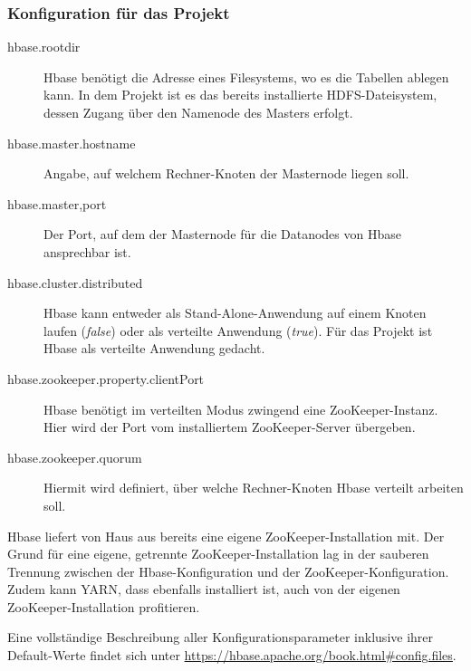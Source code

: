 \subsubsection{Konfiguration für das Projekt}

\lstset{basicstyle=\small}


\begin{description}
	\item[hbase.rootdir] Hbase benötigt die Adresse eines Filesystems, wo es die Tabellen ablegen kann. In dem Projekt ist es das bereits installierte
	HDFS-Dateisystem, dessen Zugang über den Namenode des Masters erfolgt.
	\item[hbase.master.hostname] Angabe, auf welchem Rechner-Knoten der Masternode liegen soll.
	\item[hbase.master,port] Der Port, auf dem der Masternode für die Datanodes von Hbase ansprechbar ist.
	\item[hbase.cluster.distributed] Hbase kann entweder als Stand-Alone-Anwendung auf einem Knoten laufen (\textit{false}) oder als verteilte Anwendung (\textit{true}).
	Für das Projekt ist Hbase als verteilte Anwendung gedacht.
	\item[hbase.zookeeper.property.clientPort] Hbase benötigt im verteilten Modus zwingend eine ZooKeeper-Instanz. Hier wird der Port vom installiertem ZooKeeper-Server 
	übergeben.
	\item[hbase.zookeeper.quorum] Hiermit wird definiert, über welche Rechner-Knoten Hbase verteilt arbeiten soll. 
\end{description}

Hbase liefert von Haus aus bereits eine eigene ZooKeeper-Installation mit. Der Grund für eine eigene, getrennte ZooKeeper-Installation lag in der
sauberen Trennung zwischen der Hbase-Konfiguration und der ZooKeeper-Konfiguration. Zudem kann YARN, dass ebenfalls installiert ist, auch von der
eigenen ZooKeeper-Installation profitieren.

Eine vollständige Beschreibung aller Konfigurationsparameter inklusive ihrer Default-Werte findet sich unter \url{https://hbase.apache.org/book.html#config.files}.